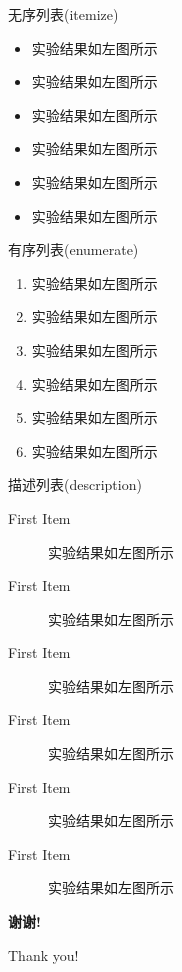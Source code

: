 \documentclass[8pt,compress,t,noamsthm,notheorem,handout,table]{beamer}
\theoremstyle{nonumberplain}%
\theoremstyle{plain}
\begin{document}

\begin{frame}{无序列表(itemize)}
	\begin{itemize}
		\item 实验结果如左图所示
		\item 实验结果如左图所示
		\item 实验结果如左图所示
		\item 实验结果如左图所示
		\item 实验结果如左图所示
		\item 实验结果如左图所示
	\end{itemize}
\end{frame}

\begin{frame}{有序列表(enumerate)}
	\begin{enumerate}
	\item 实验结果如左图所示
	\item 实验结果如左图所示
	\item 实验结果如左图所示
	\item 实验结果如左图所示
	\item 实验结果如左图所示
	\item 实验结果如左图所示
	\end{enumerate}
\end{frame}

\begin{frame}{描述列表(description)}
	\begin{description}
	\item[First Item] 实验结果如左图所示
	\item[First Item] 实验结果如左图所示
	\item[First Item] 实验结果如左图所示
	\item[First Item] 实验结果如左图所示
	\item[First Item] 实验结果如左图所示
	\item[First Item] 实验结果如左图所示
	\end{description}
\end{frame}

\begin{frame}[c,plain]
\begin{center}
\Huge\color{red}\heiti\bfseries 谢\quad 谢!

  Thank you!
\end{center}
\end{frame}
\end{document}
